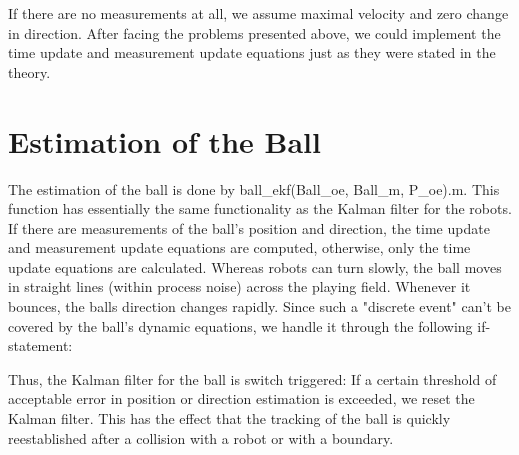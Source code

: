 

If there are no measurements at all, we assume maximal velocity and zero change in direction.
After facing the problems presented above, we could implement the time update and measurement update equations just as they were stated in the theory.

\section{Estimation of the Ball}

The estimation of the ball is done by {\selectfont ball\_ekf(Ball\_oe, Ball\_m, P\_oe).m}. This function has essentially the same functionality as the Kalman filter for the robots. If there are measurements of the ball's position and direction, the time update and measurement update equations are computed, otherwise, only the time update equations are calculated. Whereas robots can turn slowly, the ball moves in straight lines (within process noise) across the playing field. Whenever it bounces, the balls direction changes rapidly. Since such a "discrete event" can't be covered by the ball's dynamic equations, we handle it through the following if-statement:



Thus, the Kalman filter for the ball is switch triggered: If a certain threshold of acceptable error in position or direction estimation is exceeded, we reset the Kalman filter. This has the effect that the tracking of the ball is quickly reestablished after a collision with a robot or with a boundary.



